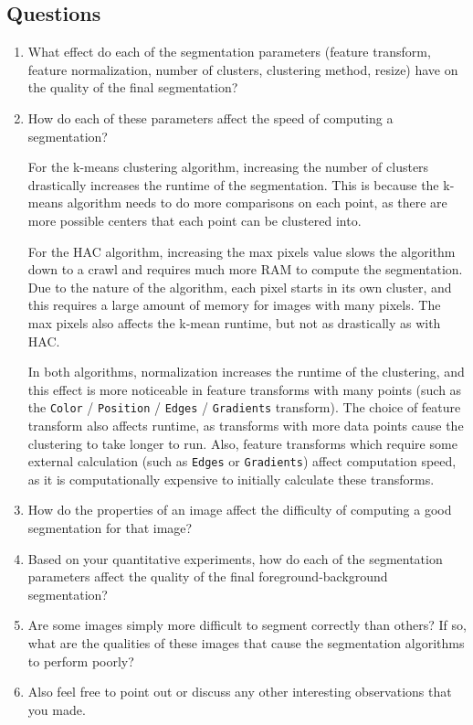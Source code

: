 \documentclass[12pt]{article}
\begin{document}
\subsection{Questions}
\begin{enumerate}
	\item What effect do each of the segmentation parameters (feature
	transform, feature normalization, number of clusters, clustering
	method, resize) have on the quality of the final segmentation?
	
	
	\item How do each of these parameters affect the speed of computing a
	segmentation?
	
	For the k-means clustering algorithm, increasing the number of clusters drastically increases the runtime of the segmentation. This is because the k-means algorithm needs to do more comparisons on each point, as there are more possible centers that each point can be clustered into.
	
	
	For the HAC algorithm, increasing the max pixels value slows the algorithm down to a crawl and requires much more RAM to compute the segmentation. Due to the nature of the algorithm, each pixel starts in its own cluster, and this requires a large amount of memory for images with many pixels. The max pixels also affects the k-mean runtime, but not as drastically as with HAC.
	
	In both algorithms, normalization increases the runtime of the clustering, and this effect is more noticeable in feature transforms with many points (such as the \texttt{Color} / \texttt{Position} / \texttt{Edges} / \texttt{Gradients} transform). The choice of feature transform also affects runtime, as transforms with more data points cause the clustering to take longer to run. Also, feature transforms which require some external calculation (such as \texttt{Edges} or \texttt{Gradients}) affect computation speed, as it is computationally expensive to initially calculate these transforms.
	
	
	\item How do the properties of an image affect the difficulty of computing a
	good segmentation for that image?
	

	\item Based on your quantitative experiments, how do each of the segmentation
parameters affect the quality of the final foreground-background
segmentation?


	\item Are some images simply more difficult to segment correctly than others? If
so, what are the qualities of these images that cause the segmentation
algorithms to perform poorly?


	\item Also feel free to point out or discuss any other interesting observations that
you made.
	
\end{enumerate}
\end{document}

